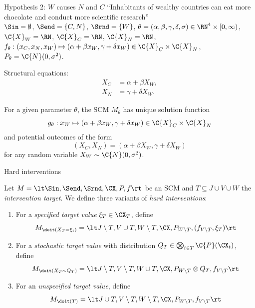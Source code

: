 \begin{frame}{Hypothesis 2: $W$ causes $N$ and $C$}
  ``Inhabitants of wealthy countries can eat more chocolate and conduct more scientific research''\\

  $\Sin = \emptyset$, $\Send = \{C,N\}$, $\Srnd = \{W\}$, $\theta = (\alpha,\beta,\gamma,\delta,\sigma) \in \RN^4 \times [0,\infty)$, $\C{X}_W = \RN$, $\C{X}_C = \RN$, $\C{X}_N = \RN$, $f_{\theta} : (x_C,x_N,x_W) \mapsto (\alpha + \beta x_W, \gamma + \delta x_W) \in \C{X}_C \times \C{X}_N$, $P_{\theta} = \C{N}(0,\sigma^2)$.

  Structural equations:
    \begin{align*}
      X_C & = \alpha + \beta X_W, \\
      X_N & = \gamma + \delta X_W.
    \end{align*}
  
  For a given parameter $\theta$, the SCM $M_{\theta}$ has unique solution function 
  $$g_\theta : x_W \mapsto (\alpha + \beta x_W, \gamma + \delta x_W) \in \C{X}_C \times \C{X}_N$$
  and potential outcomes of the form
  $$(X_C,X_N) = (\alpha + \beta X_W, \gamma + \delta X_W)$$ 
  for any random variable $X_W \sim \C{N}(0,\sigma^2)$.
\end{frame}

\begin{frame}{Hard interventions}
  \begin{Def}
  Let $M = \lt \Sin, \Send, \Srnd, \CX, P, f \rt$ be an SCM and
  $T \subseteq J \cup V \cup W$ the \emph{intervention target}. We define three variants of \emph{hard interventions}:
    \begin{enumerate}
      \item For a \emph{specified target value} $\xi_T \in \CX_T$, define
    $$M_{\doit(X_T=\xi_t)} = \lt J\setminus T, V \cup T, W \setminus T, \CX, P_{W\setminus T}, (f_{V\setminus T},\xi_T)\rt$$
  \item For a \emph{stochastic target value} with distribution $Q_T \in \bigotimes_{t\in T} \C{P}(\CX_t)$, define
    $$M_{\doit(X_T\sim Q_T)} = \lt J\setminus T, V \setminus T, W \cup T, \CX, P_{W\setminus T} \otimes Q_T, f_{V\setminus T}\rt$$
  \item For an \emph{unspecified target value}, define
    $$M_{\doit(T)} = \lt J\cup T, V\setminus T, W \setminus T, \CX, P_{W\setminus T}, f_{V\setminus T} \rt$$
    \end{enumerate}
  \end{Def}
\end{frame}

